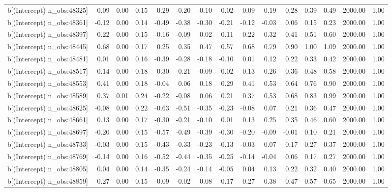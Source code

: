 \begin{table}[ht]
\begin{tabular}{rrrrrrrrrrrrrrr}
  b[(Intercept) n\_obs:48325] & 0.09 & 0.00 & 0.15 & -0.29 & -0.20 & -0.10 & -0.02 & 0.09 & 0.19 & 0.28 & 0.39 & 0.49 & 2000.00 & 1.00 \\ 
  b[(Intercept) n\_obs:48361] & -0.12 & 0.00 & 0.14 & -0.49 & -0.38 & -0.30 & -0.21 & -0.12 & -0.03 & 0.06 & 0.15 & 0.23 & 2000.00 & 1.00 \\ 
  b[(Intercept) n\_obs:48397] & 0.22 & 0.00 & 0.15 & -0.16 & -0.09 & 0.02 & 0.11 & 0.22 & 0.32 & 0.41 & 0.51 & 0.60 & 2000.00 & 1.00 \\ 
  b[(Intercept) n\_obs:48445] & 0.68 & 0.00 & 0.17 & 0.25 & 0.35 & 0.47 & 0.57 & 0.68 & 0.79 & 0.90 & 1.00 & 1.09 & 2000.00 & 1.00 \\ 
  b[(Intercept) n\_obs:48481] & 0.01 & 0.00 & 0.16 & -0.39 & -0.28 & -0.18 & -0.10 & 0.01 & 0.12 & 0.22 & 0.33 & 0.42 & 2000.00 & 1.00 \\ 
  b[(Intercept) n\_obs:48517] & 0.14 & 0.00 & 0.18 & -0.30 & -0.21 & -0.09 & 0.02 & 0.13 & 0.26 & 0.36 & 0.48 & 0.58 & 2000.00 & 1.00 \\ 
  b[(Intercept) n\_obs:48553] & 0.41 & 0.00 & 0.18 & -0.04 & 0.06 & 0.18 & 0.29 & 0.41 & 0.53 & 0.64 & 0.76 & 0.90 & 2000.00 & 1.00 \\ 
  b[(Intercept) n\_obs:48589] & 0.37 & 0.01 & 0.24 & -0.22 & -0.08 & 0.06 & 0.21 & 0.37 & 0.53 & 0.68 & 0.83 & 0.99 & 2000.00 & 1.00 \\ 
  b[(Intercept) n\_obs:48625] & -0.08 & 0.00 & 0.22 & -0.63 & -0.51 & -0.35 & -0.23 & -0.08 & 0.07 & 0.21 & 0.36 & 0.47 & 2000.00 & 1.00 \\ 
  b[(Intercept) n\_obs:48661] & 0.13 & 0.00 & 0.17 & -0.30 & -0.21 & -0.10 & 0.01 & 0.13 & 0.25 & 0.35 & 0.46 & 0.60 & 2000.00 & 1.00 \\ 
  b[(Intercept) n\_obs:48697] & -0.20 & 0.00 & 0.15 & -0.57 & -0.49 & -0.39 & -0.30 & -0.20 & -0.09 & -0.01 & 0.10 & 0.21 & 2000.00 & 1.00 \\ 
  b[(Intercept) n\_obs:48733] & -0.03 & 0.00 & 0.15 & -0.43 & -0.33 & -0.23 & -0.13 & -0.03 & 0.07 & 0.17 & 0.27 & 0.37 & 2000.00 & 1.00 \\ 
  b[(Intercept) n\_obs:48769] & -0.14 & 0.00 & 0.16 & -0.52 & -0.44 & -0.35 & -0.25 & -0.14 & -0.04 & 0.06 & 0.17 & 0.27 & 2000.00 & 1.00 \\ 
  b[(Intercept) n\_obs:48805] & 0.04 & 0.00 & 0.14 & -0.35 & -0.24 & -0.14 & -0.05 & 0.04 & 0.13 & 0.22 & 0.32 & 0.40 & 2000.00 & 1.00 \\ 
  b[(Intercept) n\_obs:48859] & 0.27 & 0.00 & 0.15 & -0.09 & -0.02 & 0.08 & 0.17 & 0.27 & 0.38 & 0.47 & 0.57 & 0.65 & 2000.00 & 1.00 \\ 

\end{tabular}
\end{table}
